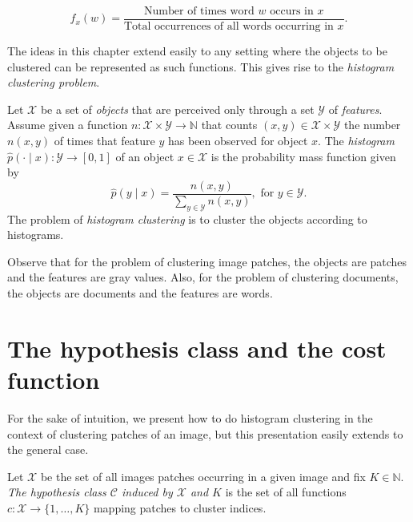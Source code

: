 \begin{equation}
f_x(w) = \frac{\text{Number of times word $w$ occurs in $x$}}{\text{Total occurrences of all words occurring in $x$}}.
\end{equation}

The ideas in this chapter extend easily to any setting where the objects
to be clustered can be represented as such functions. This gives rise to the \emph{histogram clustering problem}.

\begin{definition}
Let $\mathcal{X}$ be a set of \emph{objects} that are perceived only through a set $\mathcal{Y}$ of \emph{features}. Assume given a function $n : \mathcal{X} \times \mathcal{Y} \to \mathbb{N}$ that counts $(x, y) \in \mathcal{X} \times \mathcal{Y}$ the number $n(x,y)$ of times that feature $y$ has been observed for object $x$. The \emph{histogram} $\hat{p}\left(\cdot \mid x\right) : \mathcal{Y} \to [0, 1]$ of an object $x \in \mathcal{X}$ is the probability mass function given by
%
\begin{equation}
\hat{p}\left(y \mid x\right) = \frac{n(x,y)}{\sum_{y \in \mathcal{Y}}n(x, y)}, \text{ for $y \in \mathcal{Y}$}.
\end{equation}
%
The problem of \emph{histogram clustering} is to cluster the objects according to histograms.
\end{definition}

Observe that for the problem of clustering image patches, the objects are
patches and the features are gray values. Also, for the problem of clustering
documents, the objects are documents and the features are words.

\section{The hypothesis class and the cost function}

For the sake of intuition, we present how to do histogram clustering in
the context of clustering patches of an image, but this presentation easily
extends to the general case.

\begin{definition}
Let $\mathcal{X}$ be the set of all images patches occurring in a given image and fix $K \in \mathbb{N}$. \emph{The hypothesis class $\mathcal{C}$ induced by $\mathcal{X}$ and $K$} is the set of all functions $c : \mathcal{X} \to \{1, \ldots, K\}$ mapping patches to cluster indices.
\end{definition}

